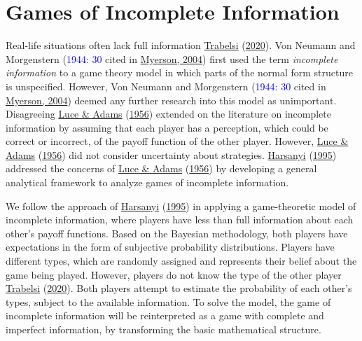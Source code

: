 \documentclass[11pt,preprint, authoryear]{elsarticle}
\numberwithin{equation}{section}
\numberwithin{figure}{section}
\numberwithin{table}{section}
\begin{document}
\hypertarget{games-of-incomplete-information}{%
\section{\texorpdfstring{Games of Incomplete Information
\label{lit}}{Games of Incomplete Information }}\label{games-of-incomplete-information}}

Real-life situations often lack full information
\protect\hyperlink{ref-2020games}{Trabelsi}
(\protect\hyperlink{ref-2020games}{2020}). Von Neumann and Morgenstern
(\textcolor{blue}{1944: 30} cited in
\protect\hyperlink{ref-2004com}{Myerson, 2004}) first used the term
\emph{incomplete information} to a game theory model in which parts of
the normal form structure is unspecified. However, Von Neumann and
Morgenstern (\textcolor{blue}{1944: 30} cited in
\protect\hyperlink{ref-2004com}{Myerson, 2004}) deemed any further
research into this model as unimportant. Disagreeing
\protect\hyperlink{ref-luce1956}{Luce \& Adams}
(\protect\hyperlink{ref-luce1956}{1956}) extended on the literature on
incomplete information by assuming that each player has a perception,
which could be correct or incorrect, of the payoff function of the other
player. However, \protect\hyperlink{ref-luce1956}{Luce \& Adams}
(\protect\hyperlink{ref-luce1956}{1956}) did not consider uncertainty
about strategies. \protect\hyperlink{ref-harsanyi}{Harsanyi}
(\protect\hyperlink{ref-harsanyi}{1995}) addressed the concerns of
\protect\hyperlink{ref-luce1956}{Luce \& Adams}
(\protect\hyperlink{ref-luce1956}{1956}) by developing a general
analytical framework to analyze games of incomplete information.

We follow the approach of \protect\hyperlink{ref-harsanyi}{Harsanyi}
(\protect\hyperlink{ref-harsanyi}{1995}) in applying a game-theoretic
model of incomplete information, where players have less than full
information about each other's payoff functions. Based on the Bayesian
methodology, both players have expectations in the form of subjective
probability distributions. Players have different types, which are
randomly assigned and represents their belief about the game being
played. However, players do not know the type of the other player
\protect\hyperlink{ref-2020games}{Trabelsi}
(\protect\hyperlink{ref-2020games}{2020}). Both players attempt to
estimate the probability of each other's types, subject to the available
information. To solve the model, the game of incomplete information will
be reinterpreted as a game with complete and imperfect information, by
transforming the basic mathematical structure.
\end{document}
